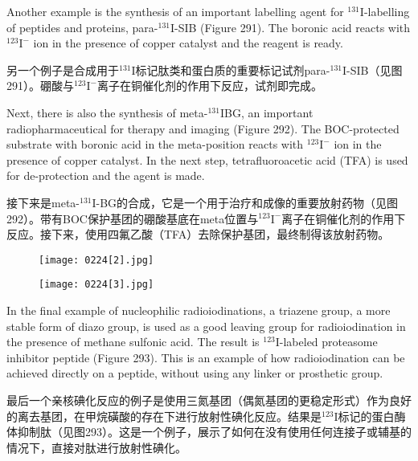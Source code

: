 \documentclass[dvipsnames, svgnames,a4paper,11pt]{article}
\begin{document}
Another example is the synthesis of an important labelling agent for \(\mathrm{^{131}I}\)-labelling of peptides and proteins, para-\(\mathrm{^{131}I}\)-SIB (Figure 291). The boronic acid reacts with \(\mathrm{^{123}I^-}\) ion in the presence of copper catalyst and the reagent is ready.  

另一个例子是合成用于\(\mathrm{^{131}I}\)标记肽类和蛋白质的重要标记试剂para-\(\mathrm{^{131}I}\)-SIB（见图291）。硼酸与\(\mathrm{^{123}I^-}\)离子在铜催化剂的作用下反应，试剂即完成。  

Next, there is also the synthesis of meta-\(\mathrm{^{131}I}\)BG, an important radiopharmaceutical for therapy and imaging (Figure 292). The BOC-protected substrate with boronic acid in the meta-position reacts with \(\mathrm{^{123}I^-}\) ion in the presence of copper catalyst. In the next step, tetrafluoroacetic acid (TFA) is used for de-protection and the agent is made.  

接下来是meta-\(\mathrm{^{131}I}\)-BG的合成，它是一个用于治疗和成像的重要放射药物（见图292）。带有BOC保护基团的硼酸基底在meta位置与\(\mathrm{^{123}I^-}\)离子在铜催化剂的作用下反应。接下来，使用四氟乙酸（TFA）去除保护基团，最终制得该放射药物。  

\begin{figure}[h]
	\centering
    \texttt{[image: 0224[2].jpg]}  
     \label{fig292}
\end{figure}

\begin{figure}[h]
	\centering
    \texttt{[image: 0224[3].jpg]}  
     \label{fig293}
\end{figure}

In the final example of nucleophilic radioiodinations, a triazene group, a more stable form of diazo group, is used as a good leaving group for radioiodination in the presence of methane sulfonic acid. The result is \(\mathrm{^{123}I}\)-labeled proteasome inhibitor peptide (Figure 293). This is an example of how radioiodination can be achieved directly on a peptide, without using any linker or prosthetic group.

最后一个亲核碘化反应的例子是使用三氮基团（偶氮基团的更稳定形式）作为良好的离去基团，在甲烷磺酸的存在下进行放射性碘化反应。结果是\(\mathrm{^{123}I}\)标记的蛋白酶体抑制肽（见图293）。这是一个例子，展示了如何在没有使用任何连接子或辅基的情况下，直接对肽进行放射性碘化。
\end{document}
